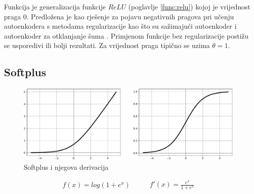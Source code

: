 \documentclass[times, utf8, numeric, diplomski]{fer}
\def\secref#1{(poglavlje \ref{#1})}
\def\TODO#1{\noindent\textcolor{red}{TODO: \textit{#1}}\newline}
\def\todo#1{\TODO{#1}}
\def\todoimg#1{\begin{center} \textcolor{red}{\big[ IMAGE: \textit{#1} \big]} \end{center}}
\begin{document}
Funkcija je generalizacija funkcije $ReLU$ \secref{func:relu} kojoj je vrijednost praga $0$. Predložena je kao rješenje za pojavu negativnih pragova pri učenju autoenkodera s metodama regularizacije kao što su sažimajući autoenkoder  i autoenkoder za otklanjanje šuma . Primjenom funkcije bez regularizacije postižu se usporedivi ili bolji rezultati. Za vrijednost praga tipično se uzima $\theta = 1$. \citep{threlu}

%

\subsection{Softplus}

\begin{figure}[H]
\includegraphics[width=\textwidth]{func_Softplus.pdf}
\centering
\caption{Softplus i njegova derivacija}
\label{fig:softplus}
\end{figure}

\begin{equation}
\label{eq:softplus}
\begin{split}
f(x) = log(1+e^x)
\end{split}
\qquad
\begin{split}
f'(x) = \frac{e^x}{1+e^x}
\end{split}
\end{equation}
\end{document}
